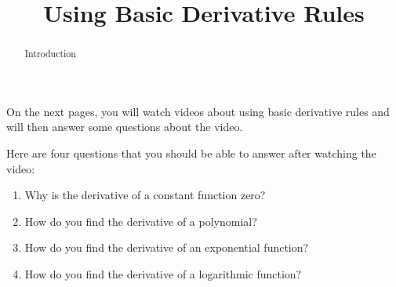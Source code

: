 \documentclass[handout]{ximera}
\title{Using Basic Derivative Rules}
\begin{document}
\begin{abstract} Introduction %
\end{abstract}


\maketitle

On the next pages, you will watch videos about using basic derivative rules and will then answer some questions about the video.

Here are four questions that you should be able to answer after watching the video:
\begin{enumerate}
\item Why is the derivative of a constant function zero?
\item How do you find the derivative of a polynomial?
\item How do you find the derivative of an exponential function?
\item How do you find the derivative of a logarithmic function?
\end{enumerate}
\end{document}
